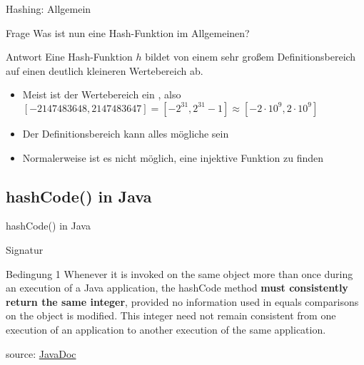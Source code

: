 \documentclass[usepdftitle=false,hyperref={pdfpagelabels=false}]{beamer}
\begin{document}
\begin{frame}{Hashing: Allgemein}
    \begin{block}{Frage}
        Was ist nun eine Hash-Funktion im Allgemeinen?
    \end{block}

    \begin{block}{Antwort}
        Eine Hash-Funktion $h$ bildet von einem sehr großem
        Definitionsbereich auf einen deutlich kleineren Wertebereich
        ab.
    \end{block}

    \pause

    \begin{itemize}[<+->]
        \item Meist ist der Wertebereich ein , also $[-2147483648, 2147483647] = [-2^{31},2^{31}-1] \approx [-2 \cdot 10^9, 2 \cdot 10^9]$
        \item Der Definitionsbereich kann alles mögliche sein
        \item Normalerweise ist es nicht möglich, eine injektive Funktion zu finden
    \end{itemize}
\end{frame}

\subsection{hashCode() in Java}
\begin{frame}{hashCode() in Java}
    \begin{block}{Signatur}
    \end{block}

    \pause

    \begin{block}{Bedingung 1}
        Whenever it is invoked on the same object more than once
        during an execution of a Java application, the hashCode
        method \textbf{must consistently return the same integer},
        provided no information used in equals comparisons on the
        object is modified. This integer need not remain consistent
        from one execution of an application to another execution of
        the same application.
    \end{block}
    {\tiny source: \href{http://docs.oracle.com/javase/7/docs/api/java/lang/Object.html\#hashCode()}{JavaDoc}}
\end{frame}
\end{document}
